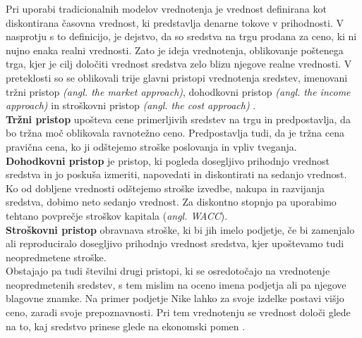 Pri uporabi tradicionalnih modelov vrednotenja je vrednost definirana kot diskontirana časovna vrednost, ki predstavlja denarne tokove v prihodnosti. V nasprotju s to definicijo, je dejstvo, da so sredstva na trgu prodana za ceno, ki ni nujno enaka realni vrednosti. Zato je ideja vrednotenja, oblikovanje poštenega trga, kjer je cilj določiti vrednost sredstva zelo blizu njegove realne vrednosti. V preteklosti so se oblikovali trije glavni pristopi vrednotenja sredstev, imenovani tržni pristop \textit{(angl. the market approach)}, dohodkovni pristop \textit{(angl. the income approach)} in stroškovni pristop \textit{(angl. the cost approach)} \cite[str. 63]{Mun}.\\

\textbf{Tržni pristop} upošteva cene primerljivih sredstev na trgu in predpostavlja, da bo tržna moč oblikovala ravnotežno ceno. Predpostavlja tudi, da je tržna cena pravična cena, ko ji odštejemo stroške poslovanja in vpliv tveganja. \\

\textbf{Dohodkovni pristop} je pristop, ki pogleda dosegljivo prihodnjo vrednost sredstva in jo poskuša izmeriti, napovedati in diskontirati na sedanjo vrednost. Ko od dobljene vrednosti odštejemo stroške izvedbe, nakupa in razvijanja sredstva, dobimo neto sedanjo vrednost. Za diskontno stopnjo pa uporabimo tehtano povprečje stroškov kapitala (\textit{angl. WACC}).\\

\textbf{Stroškovni pristop} obravnava stroške, ki bi jih imelo podjetje, če bi zamenjalo ali reproduciralo dosegljivo prihodnjo vrednost sredstva, kjer upoštevamo tudi neopredmetene stroške.\\

Obstajajo pa tudi številni drugi pristopi, ki se osredotočajo na vrednotenje neopredmetenih sredstev, s tem mislim na oceno imena podjetja ali pa njegove blagovne znamke. Na primer podjetje Nike lahko za svoje izdelke postavi višjo ceno, zaradi svoje prepoznavnosti. Pri tem vrednotenju se vrednost določi glede na to, kaj sredstvo prinese glede na ekonomski pomen \cite[str. 64, 65]{Mun}. \\

